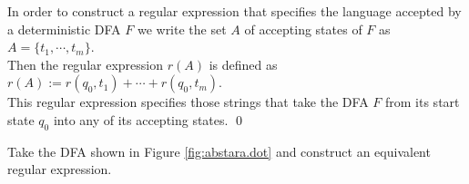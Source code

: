 In order to construct a regular expression that specifies the language accepted by a deterministic \textsc{DFA}
$F$ we write the set $A$ of accepting states of $F$ as
\\[0.2cm]
\hspace*{1.3cm}
$A = \{ t_1, \cdots, t_m \}$.
\\[0.2cm]
Then the regular expression $r(A)$ is defined as
\\[0.2cm]
\hspace*{1.3cm}
$r(A) := r(q_0, t_1) + \cdots + r(q_0, t_m)$.
\\[0.2cm]
This regular expression specifies those strings that take the \textsc{DFA} $F$ from its start state $q_0$ into
any of its accepting states.
\qed


\exerciseEng
Take the \textsc{DFA} shown in Figure \ref{fig:abstara.dot} and construct an equivalent regular expression.


